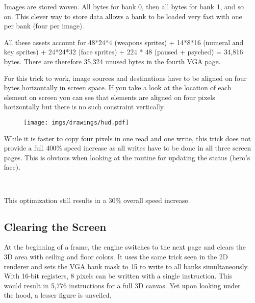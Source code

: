  Images are stored woven. All bytes for bank 0, then all bytes for bank 1, and so on. This clever way to store data allows a bank to be loaded very fast with one  per bank (four  per image).\\
\par
All these assets account for 48*24*4 (weapons sprites) + 14*8*16 (numeral and key sprites) + 24*24*32 (face sprites) + 224 * 48 (paused + psyched) = 34,816 bytes. There are therefore 35,324 unused bytes in the fourth VGA page.\\
\par
For this trick to work, image sources and destinations have to be aligned on four bytes horizontally in screen space. If you take a look at the location of each element on screen you can see that elements are aligned on four pixels horizontally but there is no such constraint vertically.
\begin{figure}[H]
  \centering
 \texttt{[image: imgs/drawings/hud.pdf]}
\end{figure}

While it is faster to copy four pixels in one read and one write, this trick does not provide a full 400\% speed increase as all writes have to be done in all three screen pages. This is obvious when looking at the routine for updating the status (hero's face).\\
\par
\begin{minipage}{\textwidth}

\end{minipage}\\
\par
This optimization still results in a 30\% overall speed increase.\\
\par










\vspace{-10pt}
\subsection{Clearing the Screen}
At the beginning of a frame, the engine switches to the next page and clears the 3D area with ceiling and floor colors. It uses the same trick seen in the 2D renderer and sets the VGA bank mask to 15 to write to all banks simultaneously. With 16-bit registers, 8 pixels can be written with a single instruction. This would result in 5,776 instructions for a full 3D canvas. Yet upon looking under the hood, a lesser figure is unveiled.\\ 
\par
{}


